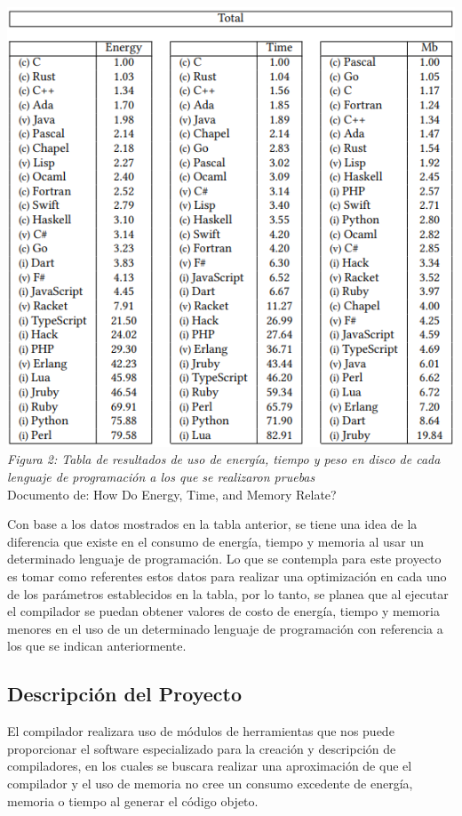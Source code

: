\documentclass[10pt,executivepaper]{article}
\begin{document}
\begin{center}
  \includegraphics[scale=0.7]{imgs/tabla2.png}
  \\\textit{Figura 2: Tabla de resultados de uso de energía, tiempo y peso en disco de cada lenguaje de programación a los que se realizaron pruebas }\\{\scriptsize Documento de: How Do Energy, Time, and Memory Relate?}
\end{center}
Con base a los datos mostrados en la tabla anterior, se tiene una idea de la diferencia que existe en el consumo de energía, tiempo y memoria al usar un determinado lenguaje de programación. Lo que se contempla para este proyecto es tomar como referentes estos datos para realizar una optimización en cada uno de los parámetros establecidos en la tabla, por lo tanto, se planea que al ejecutar el compilador se puedan obtener valores de costo de energía, tiempo y memoria menores en el uso de un determinado lenguaje de programación con referencia a los que se indican anteriormente.
\subsection{Descripción del Proyecto}
El compilador realizara uso de módulos de herramientas que nos puede proporcionar el software especializado para la creación y descripción de compiladores, en los cuales se buscara realizar una aproximación de que el compilador y el uso de memoria no cree un consumo excedente de energía, memoria o tiempo al generar el código objeto.
\end{document}
